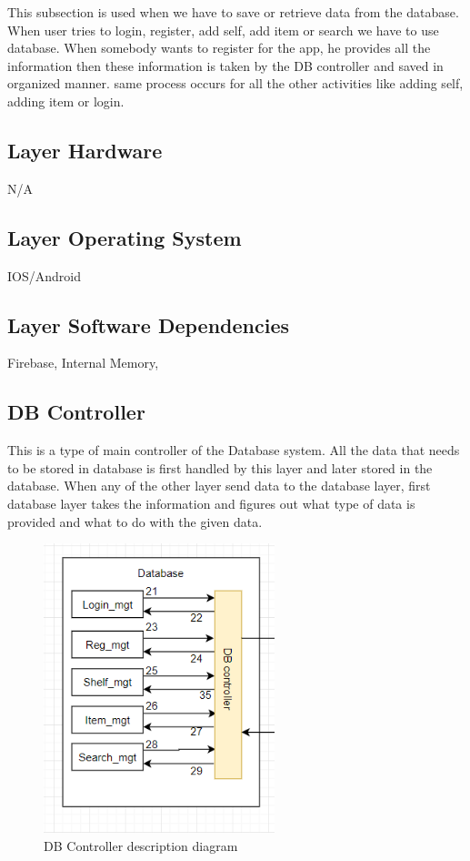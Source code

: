 This subsection is used when we have to save or retrieve data from the database. When user tries to login, register, add self, add item or search we have to use database. When somebody wants to register for the app, he provides all the information then these information is taken by the DB controller and saved in organized manner. same process occurs for all the other activities like adding self, adding item or login.

\subsection{Layer Hardware}
N/A

\subsection{Layer Operating System}
IOS/Android

\subsection{Layer Software Dependencies}
Firebase, Internal Memory,


\subsection{DB Controller}
This is a type of main controller of the Database system. All the data that needs to be stored in database is first handled by this layer and later stored in the database. When any of the other layer send data to the database layer, first database layer takes the information and figures out what type of data is provided and what to do with the given data.

\begin{figure}[h!]
	\centering
 	\includegraphics[width=0.60\textwidth]{images/dbcontroller}
 \caption{DB Controller description diagram}
\end{figure}

